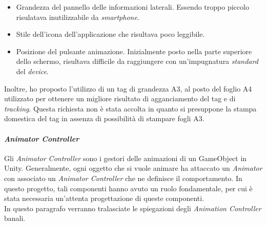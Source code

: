 \begin{itemize}
	\item Grandezza del pannello delle informazioni laterali. Essendo troppo piccolo risulatava inutilizzabile da \textit{smartphone}.
	\item Stile dell'icona dell'applicazione che risultava poco leggibile.
	\item Posizione del pulsante animazione. Inizialmente posto nella parte superiore dello schermo, risultava difficile da raggiungere con un'impugnatura \textit{standard} del \textit{device}.
\end{itemize}
\noindent
Inoltre, ho proposto l'utilizzo di un tag di grandezza A3, al posto del foglio A4 utilizzato per ottenere un migliore risultato di agganciamento del tag e di \textit{tracking}. Questa richiesta non \`e stata accolta in quanto si presuppone la stampa domestica del tag in assenza di possibilit\`a di stampare fogli A3.\\


\paragraph{\textit{Animator Controller}}
Gli \textit{Animator Controller} sono i gestori delle animazioni di un GameObject in Unity. Generalmente, ogni oggetto che si vuole animare ha attaccato un \textit{Animator} con associato un \textit{Animator Controller} che ne definisce il comportamento. In questo progetto, tali componenti hanno avuto un ruolo fondamentale, per cui \`e stata necessaria un'attenta progettazione di queste componenti.\\
In questo paragrafo verranno tralasciate le spiegazioni degli \textit{Animation Controller} banali.\\

